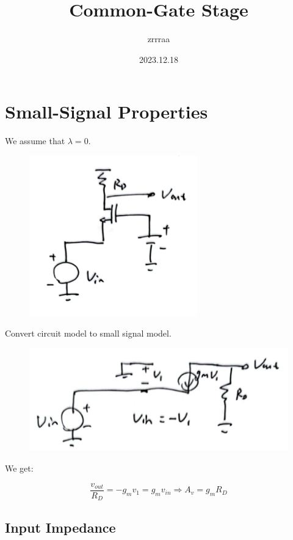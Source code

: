 \documentclass[fontset=windows]{article}
\title{\heiti\zihao{2} Common-Gate Stage}
\author{\songti zrrraa}
\date{2023.12.18}
\begin{document}
\maketitle
\thispagestyle{empty}

\section*{Small-Signal Properties}

We assume that $\lambda=0$. 

\begin{figure}[htbp]
    \centering
    \includegraphics[scale=0.8]{1.jpg}
    \captionsetup{labelformat=empty}
    \caption{}
    \label{1}
\end{figure}

Convert circuit model to small signal model. 

\begin{figure}[htbp]
    \centering
    \includegraphics[scale=0.8]{2.jpg}
    \captionsetup{labelformat=empty}
    \caption{}
    \label{2}
\end{figure}

We get: 

$$\frac{v_{out}}{R_D}=-g_mv_1=g_mv_{in}\Longrightarrow A_v=g_mR_D$$

\subsection*{Input Impedance}
\end{document}
